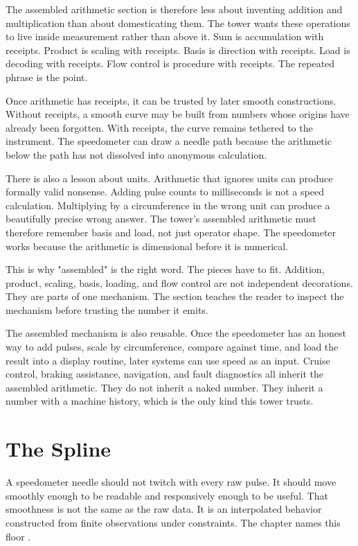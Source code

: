 The assembled arithmetic section is therefore less about inventing addition
and multiplication than about domesticating them. The tower wants these
operations to live inside measurement rather than above it. Sum is
accumulation with receipts. Product is scaling with receipts. Basis is
direction with receipts. Load is decoding with receipts. Flow control is
procedure with receipts. The repeated phrase is the point.

Once arithmetic has receipts, it can be trusted by later smooth constructions.
Without receipts, a smooth curve may be built from numbers whose origins have
already been forgotten. With receipts, the curve remains tethered to the
instrument. The speedometer can draw a needle path because the arithmetic below
the path has not dissolved into anonymous calculation.

There is also a lesson about units. Arithmetic that ignores units can produce
formally valid nonsense. Adding pulse counts to milliseconds is not a speed
calculation. Multiplying by a circumference in the wrong unit can produce a
beautifully precise wrong answer. The tower's assembled arithmetic must
therefore remember basis and load, not just operator shape. The speedometer
works because the arithmetic is dimensional before it is numerical.

This is why "assembled" is the right word. The pieces have to fit. Addition,
product, scaling, basis, loading, and flow control are not independent
decorations. They are parts of one mechanism. The section teaches the reader
to inspect the mechanism before trusting the number it emits.

The assembled mechanism is also reusable. Once the speedometer has an honest
way to add pulses, scale by circumference, compare against time, and load the
result into a display routine, later systems can use speed as an input. Cruise
control, braking assistance, navigation, and fault diagnostics all inherit the
assembled arithmetic. They do not inherit a naked number. They inherit a number
with a machine history, which is the only kind this tower trusts.

\section{The Spline}
\label{se:the-spline}

A speedometer needle should not twitch with every raw pulse. It should move
smoothly enough to be readable and responsively enough to be useful. That
smoothness is not the same as the raw data. It is an interpolated behavior
constructed from finite observations under constraints. The chapter names this
floor .

